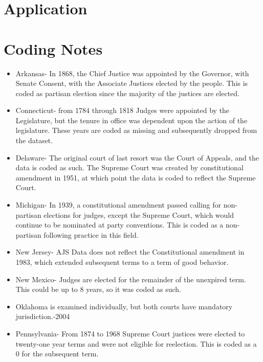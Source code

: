 \documentclass[12pt]{article}
\begin{document}
\section{Application}\label{Application}


\singlespacing



\appendix
\section{Coding Notes}\label{CodingNotes}
\begin{itemize}
	\item Arkansas- In 1868, the Chief Justice was appointed by the Governor, with Senate Consent, with the Associate Justices elected by the people.  This is coded as partisan election since the majority of the justices are elected.
	
	\item Connecticut- from 1784 through 1818 Judges were appointed by the Legislature, but the tenure in office was dependent upon the action of the legislature.  These years are coded as missing and subsequently dropped from the dataset.
	
	\item Delaware- The original court of last resort was the Court of Appeals, and the data is coded as such.  The Supreme Court was created by constitutional amendment in 1951, at which point the data is coded to reflect the Supreme Court.
	
	\item Michigan- In 1939, a constitutional amendment passed calling for non-partisan elections for judges, except the Supreme Court, which would continue to be nominated at party conventions.  This is coded as a non-partisan following practice in this field.
	
	\item New Jersey- AJS Data does not reflect the Constitutional amendment in 1983, which extended subsequent terms to a term of good behavior.
	
	\item New Mexico- Judges are elected for the remainder of the unexpired term.  This could be up to 8 years, so it was coded as such.
	
	\item Oklahoma is examined individually, but both courts have mandatory jurisdiction.-2004
	
	\item Pennsylvania- From 1874 to 1968 Supreme Court justices were elected to twenty-one year terms and were not eligible for reelection.  This is coded as a 0 for the subsequent term.
	

\end{itemize}
\end{document}
